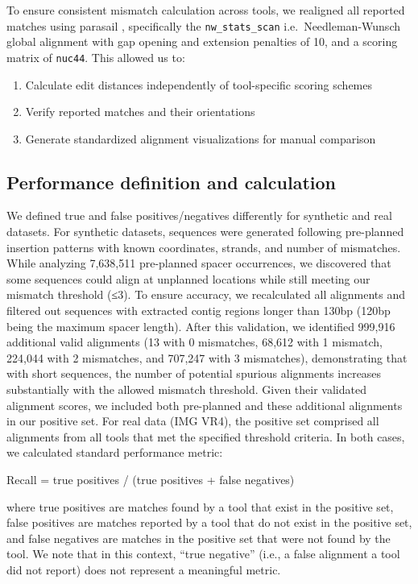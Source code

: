 \documentclass[
]{article}
\providecommand{\tightlist}{%
  \setlength{\itemsep}{0pt}\setlength{\parskip}{0pt}}\usepackage{longtable,booktabs,array}
\begin{document}
To ensure consistent mismatch calculation across tools, we realigned all
reported matches using parasail \autocite{Daily2016_parasail},
specifically the \texttt{nw\_stats\_scan} i.e.~Needleman-Wunsch global
alignment with gap opening and extension penalties of 10, and a scoring
matrix of \texttt{nuc44}. This allowed us to:

\begin{enumerate}
\def\labelenumi{\arabic{enumi}.}
\tightlist
\item
  Calculate edit distances independently of tool-specific scoring
  schemes
\item
  Verify reported matches and their orientations
\item
  Generate standardized alignment visualizations for manual comparison
\end{enumerate}

\subsection{Performance definition and
calculation}\label{sec-performance-calc}

We defined true and false positives/negatives differently for synthetic
and real datasets. For synthetic datasets, sequences were generated
following pre-planned insertion patterns with known coordinates,
strands, and number of mismatches. While analyzing 7,638,511 pre-planned
spacer occurrences, we discovered that some sequences could align at
unplanned locations while still meeting our mismatch threshold (≤3). To
ensure accuracy, we recalculated all alignments and filtered out
sequences with extracted contig regions longer than 130bp (120bp being
the maximum spacer length). After this validation, we identified 999,916
additional valid alignments (13 with 0 mismatches, 68,612 with 1
mismatch, 224,044 with 2 mismatches, and 707,247 with 3 mismatches),
demonstrating that with short sequences, the number of potential
spurious alignments increases substantially with the allowed mismatch
threshold. Given their validated alignment scores, we included both
pre-planned and these additional alignments in our positive set. For
real data (IMG VR4), the positive set comprised all alignments from all
tools that met the specified threshold criteria. In both cases, we
calculated standard performance metric:

Recall = true positives / (true positives + false negatives)

where true positives are matches found by a tool that exist in the
positive set, false positives are matches reported by a tool that do not
exist in the positive set, and false negatives are matches in the
positive set that were not found by the tool. We note that in this
context, ``true negative'' (i.e., a false alignment a tool did not
report) does not represent a meaningful metric.
\end{document}

